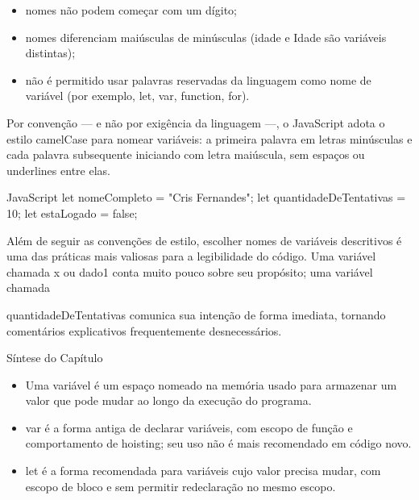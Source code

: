 \begin{itemize}
  \item nomes não podem começar com um dígito;
\end{itemize}

\begin{itemize}
  \item nomes diferenciam maiúsculas de minúsculas (idade e Idade são variáveis distintas);
\end{itemize}

\begin{itemize}
  \item não é permitido usar palavras reservadas da linguagem como nome de variável (por exemplo, let, var, function, for).
\end{itemize}

Por convenção — e não por exigência da linguagem —, o JavaScript adota o estilo camelCase para nomear variáveis: a primeira palavra em letras minúsculas e cada palavra subsequente iniciando com letra maiúscula, sem espaços ou underlines entre elas.

\begin{codebox}{JavaScript}
let nomeCompleto = "Cris Fernandes";
let quantidadeDeTentativas = 10;
let estaLogado = false;
\end{codebox}

Além de seguir as convenções de estilo, escolher nomes de variáveis descritivos é uma das práticas mais valiosas para a legibilidade do código. Uma variável chamada x ou dado1 conta muito pouco sobre seu propósito; uma variável chamada

quantidadeDeTentativas comunica sua intenção de forma imediata, tornando comentários explicativos frequentemente desnecessários.

Síntese do Capítulo

\begin{itemize}
  \item Uma variável é um espaço nomeado na memória usado para armazenar um valor que pode mudar ao longo da execução do programa.
\end{itemize}

\begin{itemize}
  \item var é a forma antiga de declarar variáveis, com escopo de função e comportamento de hoisting; seu uso não é mais recomendado em código novo.
\end{itemize}

\begin{itemize}
  \item let é a forma recomendada para variáveis cujo valor precisa mudar, com escopo de bloco e sem permitir redeclaração no mesmo escopo.
\end{itemize}


